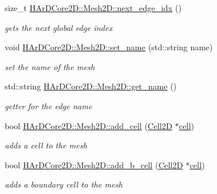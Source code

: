 \begin{DoxyCompactItemize}
size\+\_\+t \hyperlink{group__Mesh2D_ga6feb79c0ef575bf4b4b90854dcda8646}{H\+Ar\+D\+Core2\+D\+::\+Mesh2\+D\+::next\+\_\+edge\+\_\+idx} ()
\begin{DoxyCompactList}\small\item\em gets the next global edge index \end{DoxyCompactList}\item 
\mbox{\label{group__Mesh2D_ga76daba60a0d68cbc21605cf997e5219c}} 
void \hyperlink{group__Mesh2D_ga76daba60a0d68cbc21605cf997e5219c}{H\+Ar\+D\+Core2\+D\+::\+Mesh2\+D\+::set\+\_\+name} (std\+::string name)
\begin{DoxyCompactList}\small\item\em set the name of the mesh \end{DoxyCompactList}\item 
\mbox{\label{group__Mesh2D_gaba40c4bf2f22422ab55d87d7d6029e3b}} 
std\+::string \hyperlink{group__Mesh2D_gaba40c4bf2f22422ab55d87d7d6029e3b}{H\+Ar\+D\+Core2\+D\+::\+Mesh2\+D\+::get\+\_\+name} ()
\begin{DoxyCompactList}\small\item\em getter for the edge name \end{DoxyCompactList}\item 
\mbox{\label{group__Mesh2D_gac5e6d42c9fa1f3d0a55be60e119f5278}} 
bool \hyperlink{group__Mesh2D_gac5e6d42c9fa1f3d0a55be60e119f5278}{H\+Ar\+D\+Core2\+D\+::\+Mesh2\+D\+::add\+\_\+cell} (\hyperlink{classHArDCore2D_1_1Cell2D}{Cell2D} $\ast$\hyperlink{classHArDCore2D_1_1Mesh2D_a1d8c40ea85f0abe3ae5aea23e4a95583}{cell})
\begin{DoxyCompactList}\small\item\em adds a cell to the mesh \end{DoxyCompactList}\item 
\mbox{\label{group__Mesh2D_ga4e3e091b5164de9e3bb189c699810d3d}} 
bool \hyperlink{group__Mesh2D_ga4e3e091b5164de9e3bb189c699810d3d}{H\+Ar\+D\+Core2\+D\+::\+Mesh2\+D\+::add\+\_\+b\+\_\+cell} (\hyperlink{classHArDCore2D_1_1Cell2D}{Cell2D} $\ast$\hyperlink{classHArDCore2D_1_1Mesh2D_a1d8c40ea85f0abe3ae5aea23e4a95583}{cell})
\begin{DoxyCompactList}\small\item\em adds a boundary cell to the mesh \end{DoxyCompactList}\item 

\end{DoxyCompactItemize}
